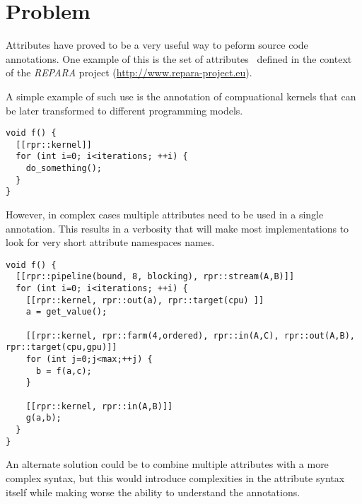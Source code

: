 \section{Problem}

Attributes have proved to be a very useful way to peform
source code annotations. One example of this is the set
of attributes~\cite{repara:d33} defined in the context of the \emph{REPARA}
project (\url{http://www.repara-project.eu}).

A simple example of such use is the annotation of compuational
kernels that can be later transformed to different
programming models.

\begin{lstlisting}
void f() {
  [[rpr::kernel]]
  for (int i=0; i<iterations; ++i) {
    do_something();
  }
}
\end{lstlisting}

However, in complex cases multiple attributes need to be
used in a single annotation. This results in a verbosity
that will make most implementations to look for very short
attribute namespaces names.

\begin{lstlisting}
void f() {
  [[rpr::pipeline(bound, 8, blocking), rpr::stream(A,B)]]
  for (int i=0; i<iterations; ++i) {
    [[rpr::kernel, rpr::out(a), rpr::target(cpu) ]]
    a = get_value();
    
    [[rpr::kernel, rpr::farm(4,ordered), rpr::in(A,C), rpr::out(A,B), rpr::target(cpu,gpu)]]
    for (int j=0;j<max;++j) {
      b = f(a,c);
    }

    [[rpr::kernel, rpr::in(A,B)]]
    g(a,b);
  }
}
\end{lstlisting}

An alternate solution could be to combine multiple attributes with a more
complex syntax, but this would introduce complexities in the attribute
syntax itself while making worse the ability to understand the annotations.
